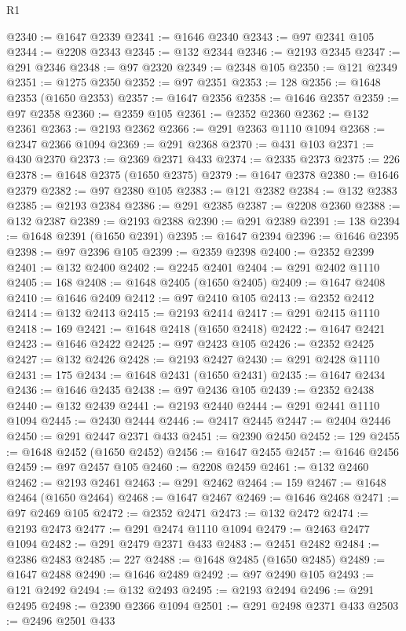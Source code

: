 \begin{lexlean}{R1}
\begin{coremodule}
{{{{{{{{{{{{{{{{{{{{{{{{{{{{{{{{{{{{{{{{{{{{{{{{{{{{{{{{{{{{{{{{{{{{{{{{{{{{{{{{{{{{{{{{{{{{{{{{{{{{{{{{{{{{{{{{{{{{{{{{{{{{{{{{{{{{{{{{{{{{{{{{{{{{{{{{{{{{{{{{{{{{{{{{{{{{{{{{{{{{{{{{{{@2340 := @1647 @2339
@2341 := @1646 @2340
@2343 := @97 @2341 @105
@2344 := @2208 @2343
@2345 := @132 @2344
@2346 := @2193 @2345
@2347 := @291 @2346
@2348 := @97 @2320
@2349 := @2348 @105
@2350 := @121 @2349
@2351 := @1275 @2350
@2352 := @97 @2351
@2353 := 128
@2356 := @1648 @2353 (@1650 @2353)
@2357 := @1647 @2356
@2358 := @1646 @2357
@2359 := @97 @2358
@2360 := @2359 @105
@2361 := @2352 @2360
@2362 := @132 @2361
@2363 := @2193 @2362
@2366 := @291 @2363 @1110 @1094
@2368 := @2347 @2366 @1094
@2369 := @291 @2368
@2370 := @431 @103
@2371 := @430 @2370
@2373 := @2369 @2371 @433
@2374 := @2335 @2373
@2375 := 226
@2378 := @1648 @2375 (@1650 @2375)
@2379 := @1647 @2378
@2380 := @1646 @2379
@2382 := @97 @2380 @105
@2383 := @121 @2382
@2384 := @132 @2383
@2385 := @2193 @2384
@2386 := @291 @2385
@2387 := @2208 @2360
@2388 := @132 @2387
@2389 := @2193 @2388
@2390 := @291 @2389
@2391 := 138
@2394 := @1648 @2391 (@1650 @2391)
@2395 := @1647 @2394
@2396 := @1646 @2395
@2398 := @97 @2396 @105
@2399 := @2359 @2398
@2400 := @2352 @2399
@2401 := @132 @2400
@2402 := @2245 @2401
@2404 := @291 @2402 @1110
@2405 := 168
@2408 := @1648 @2405 (@1650 @2405)
@2409 := @1647 @2408
@2410 := @1646 @2409
@2412 := @97 @2410 @105
@2413 := @2352 @2412
@2414 := @132 @2413
@2415 := @2193 @2414
@2417 := @291 @2415 @1110
@2418 := 169
@2421 := @1648 @2418 (@1650 @2418)
@2422 := @1647 @2421
@2423 := @1646 @2422
@2425 := @97 @2423 @105
@2426 := @2352 @2425
@2427 := @132 @2426
@2428 := @2193 @2427
@2430 := @291 @2428 @1110
@2431 := 175
@2434 := @1648 @2431 (@1650 @2431)
@2435 := @1647 @2434
@2436 := @1646 @2435
@2438 := @97 @2436 @105
@2439 := @2352 @2438
@2440 := @132 @2439
@2441 := @2193 @2440
@2444 := @291 @2441 @1110 @1094
@2445 := @2430 @2444
@2446 := @2417 @2445
@2447 := @2404 @2446
@2450 := @291 @2447 @2371 @433
@2451 := @2390 @2450
@2452 := 129
@2455 := @1648 @2452 (@1650 @2452)
@2456 := @1647 @2455
@2457 := @1646 @2456
@2459 := @97 @2457 @105
@2460 := @2208 @2459
@2461 := @132 @2460
@2462 := @2193 @2461
@2463 := @291 @2462
@2464 := 159
@2467 := @1648 @2464 (@1650 @2464)
@2468 := @1647 @2467
@2469 := @1646 @2468
@2471 := @97 @2469 @105
@2472 := @2352 @2471
@2473 := @132 @2472
@2474 := @2193 @2473
@2477 := @291 @2474 @1110 @1094
@2479 := @2463 @2477 @1094
@2482 := @291 @2479 @2371 @433
@2483 := @2451 @2482
@2484 := @2386 @2483
@2485 := 227
@2488 := @1648 @2485 (@1650 @2485)
@2489 := @1647 @2488
@2490 := @1646 @2489
@2492 := @97 @2490 @105
@2493 := @121 @2492
@2494 := @132 @2493
@2495 := @2193 @2494
@2496 := @291 @2495
@2498 := @2390 @2366 @1094
@2501 := @291 @2498 @2371 @433
@2503 := @2496 @2501 @433
}}}}}}}}}}}}}}}}}}}}}}}}}}}}}}}}}}}}}}}}}}}}}}}}}}}}}}}}}}}}}}}}}}}}}}}}}}}}}}}}}}}}}}}}}}}}}}}}}}}}}}}}}}}}}}}}}}}}}}}}}}}}}}}}}}}}}}}}}}}}}}}}}}}}}}}}}}}}}}}}}}}}}}}}}}}}}}}}}}}}}}}}}}
\end{coremodule}
\end{lexlean}
